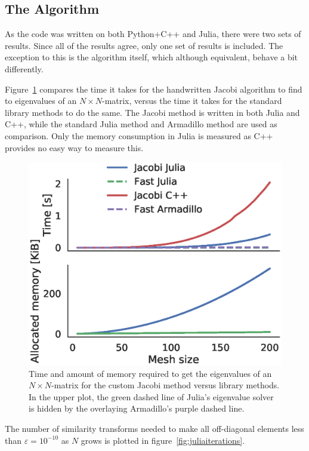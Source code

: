 \documentclass[aps,reprint]{revtex4-1}
\begin{document}
\subsection{The Algorithm}
\label{sec:algorithm}

As the code was written on both Python+C++ and Julia, there were two sets of
results. Since all of the results agree, only one set of results is included.
The exception to this is the algorithm itself, which although equivalent, behave
a bit differently.

Figure~\ref{fig:juliatiming} compares the time it takes for the handwritten
Jacobi algorithm to find to eigenvalues of an \(N\times N\)-matrix, versus the
time it takes for the standard library methods to do the same. The Jacobi method
is written in both Julia and C++, while the standard Julia method and Armadillo
method are used as comparison. Only the memory consumption in Julia is measured
as C++ provides no easy way to measure this.

\begin{figure}[ht]
  \centering
  \includegraphics[width=\columnwidth]{figures/juliatime.eps}
  \caption{\label{fig:juliatiming} Time and amount of memory required to get the eigenvalues of an
    \(N\times N\)-matrix for the custom Jacobi method versus library methods. In
  the upper plot, the green dashed line of Julia's eigenvalue solver is hidden
  by the overlaying Armadillo's purple dashed line.}
\end{figure}

The number of similarity transforms needed to make all off-diagonal elements
less than \(\varepsilon=10^{-10}\) as \(N\) grows is plotted in
figure~\ref{fig:juliaiterations}.
\end{document}
